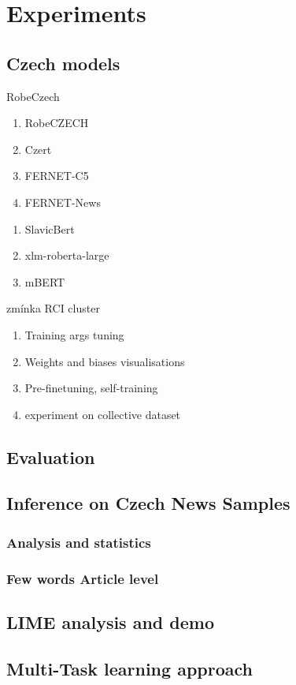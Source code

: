 \chapter{Experiments}

\section{Czech models}
RobeCzech
\begin{enumerate}
    \item RobeCZECH
    \item Czert
    \item FERNET-C5
    \item FERNET-News
\end{enumerate}

\begin{enumerate}
    \item SlavicBert
    \item xlm-roberta-large
    \item mBERT
\end{enumerate}
zmínka RCI cluster
\begin{enumerate}
    \item Training args tuning
    \item Weights and biases visualisations
    \item Pre-finetuning, self-training
    \item experiment on collective dataset
\end{enumerate}

\section{Evaluation}
\section{Inference on Czech News Samples}
\subsection{Analysis and statistics}
\subsection{Few words Article level}

\section{LIME analysis and demo}

\section{Multi-Task learning approach}\label{mtl}
